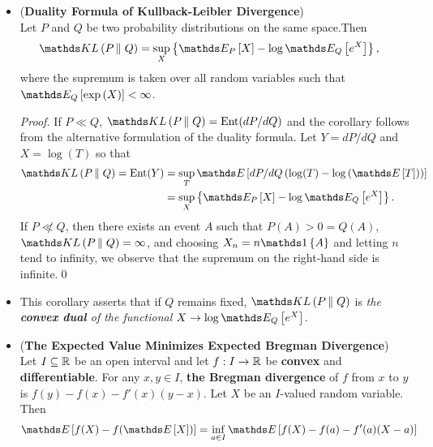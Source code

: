 \documentclass[11pt]{article}
\begin{document}
\begin{itemize}
\item \begin{corollary}  (\textbf{Duality Formula of Kullback-Leibler Divergence}) \citep{thomas2006elements, boucheron2013concentration}\\
Let $P$ and $Q$ be two probability distributions on the same space.Then
\begin{align}
\kl{P}{Q} &= \sup_{X}\set{\E{P}{X} - \log \E{Q}{e^{X}} }, \label{eqn: duality_kl_divg}
\end{align} where the supremum is taken over all random variables such that $\E{Q}{\exp\paren{X}} < \infty$.
\end{corollary}
\begin{proof}
If $P \ll Q$, $\kl{P}{Q} = \text{Ent}(dP/dQ)$ and the corollary follows from the alternative formulation of the duality formula. Let $Y=dP/dQ$ and $X = \log(T)$ so that 
\begin{align*}
\kl{P}{Q} = \text{Ent}(Y) &= \sup_{T}\E{}{dP/dQ\paren{\log(T) - \log\paren{\E{}{T}}}} \\
&= \sup_{X}\set{\E{P}{X} - \log\E{Q}{e^{X}} }.
\end{align*}
If $P \not\ll Q$, then there exists an event $A$ such that $P(A) > 0 = Q(A)$, $\kl{P}{Q} = \infty$, and choosing $X_n = n\ind{A}$ and letting $n$ tend to infinity, we observe that the supremum on the right-hand side is infinite.\qed
\end{proof}

\item \begin{remark}
This corollary asserts that if $Q$ remains fixed, $\kl{P}{Q} $ is \emph{the \textbf{convex dual} of the functional}
$X \to \log\E{Q}{e^X}$.
\end{remark}

\item \begin{theorem} (\textbf{The Expected Value Minimizes Expected Bregman Divergence}) \citep{boucheron2013concentration} \\
Let $I \subseteq {\mathbb R}$ be an open interval and let $f: I \to {\mathbb R}$ be \textbf{convex} and \textbf{differentiable}. For any $x,y \in I$, \textbf{the Bregman divergence} of $f$ from $x$ to $y$ is $f(y) - f(x) - f'(x)(y-x)$. Let $X$ be an $I$-valued random variable. Then
\begin{align}
\E{}{f(X) - f(\E{}{X}) } &= \inf_{a \in I}\E{}{f(X) - f(a) - f'(a)(X-a)}\label{eqn: bregmann_inf}
\end{align}
\end{theorem}


\end{itemize}
\end{document}
